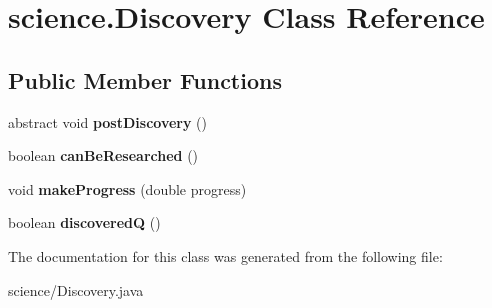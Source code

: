 \hypertarget{classscience_1_1_discovery}{}\section{science.\+Discovery Class Reference}
\label{classscience_1_1_discovery}
\subsection*{Public Member Functions}
\begin{DoxyCompactItemize}
\item 
abstract void {\bfseries post\+Discovery} ()\hypertarget{classscience_1_1_discovery_a822a352da80a98b1c966c18974d7e894}{}\label{classscience_1_1_discovery_a822a352da80a98b1c966c18974d7e894}

\item 
boolean {\bfseries can\+Be\+Researched} ()\hypertarget{classscience_1_1_discovery_a833e4396152673e5f59164f6103654e2}{}\label{classscience_1_1_discovery_a833e4396152673e5f59164f6103654e2}

\item 
void {\bfseries make\+Progress} (double progress)\hypertarget{classscience_1_1_discovery_a6453eb51658894babd27ac7cfffe7871}{}\label{classscience_1_1_discovery_a6453eb51658894babd27ac7cfffe7871}

\item 
boolean {\bfseries discoveredQ} ()\hypertarget{classscience_1_1_discovery_a874801c1faaf1118319e03eb11542abe}{}\label{classscience_1_1_discovery_a874801c1faaf1118319e03eb11542abe}

\end{DoxyCompactItemize}


The documentation for this class was generated from the following file\+:\begin{DoxyCompactItemize}
\item 
science/Discovery.\+java\end{DoxyCompactItemize}
